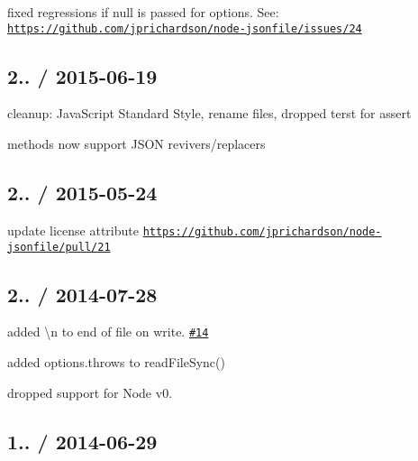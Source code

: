 \begin{DoxyItemize}
\item fixed regressions if {\ttfamily null} is passed for options. See\+: \href{https://github.com/jprichardson/node-jsonfile/issues/24}{\tt https\+://github.\+com/jprichardson/node-\/jsonfile/issues/24}
\end{DoxyItemize}

\subsection*{2.. / 2015-\/06-\/19 }


\begin{DoxyItemize}
\item cleanup\+: Java\+Script Standard Style, rename files, dropped terst for assert
\item methods now support J\+S\+ON revivers/replacers
\end{DoxyItemize}

\subsection*{2.. / 2015-\/05-\/24 }


\begin{DoxyItemize}
\item update license attribute \href{https://github.com/jprichardson/node-jsonfile/pull/21}{\tt https\+://github.\+com/jprichardson/node-\/jsonfile/pull/21}
\end{DoxyItemize}

\subsection*{2.. / 2014-\/07-\/28 }


\begin{DoxyItemize}
\item added {\ttfamily \textbackslash{}n} to end of file on write. \href{https://github.com/jprichardson/node-jsonfile/pull/14}{\tt \#14}
\item added {\ttfamily options.\+throws} to {\ttfamily read\+File\+Sync()}
\item dropped support for Node v0.
\end{DoxyItemize}

\subsection*{1.. / 2014-\/06-\/29 }



